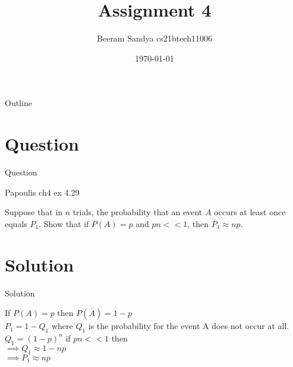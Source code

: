 \documentclass{beamer}
\title{Assignment 4}
\author{Beeram Sandya cs21btech11006}
\date{\today}
\begin{document}
\begin{frame}
    \titlepage 
\end{frame}

\logo{}


\begin{frame}{Outline}
    \tableofcontents
\end{frame}

\section{Question}
\begin{frame}{Question}
\begin{block}{Papoulis ch4 ex 4.29}

Suppose that in $n$ trials, the probability that an event $A$ occurs at least once equals $P_1$. Show that if $P\left(A\right) = p$ and $pn << 1$, then $P_1 \approx np$.

\end{block}
\end{frame}

\section{Solution}
\begin{frame}{Solution}

If $P(A) = p$ then $P(\overline A) = 1-p$ \\
$P_1 = 1-Q_1$ where $Q_1$ is the probability for the event A  does not occur at all. \\
$Q_1 = (1-p)^n$  if $pn << 1$ then \\
$\implies Q_1 \approx 1-np$ \\
$\implies P_1 \approx np$

\end{frame} 
\end{document}
